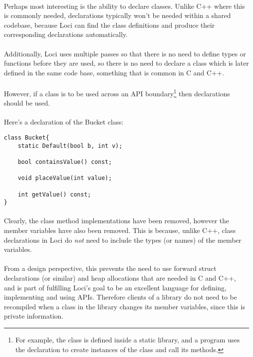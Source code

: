 \documentclass[12pt,twoside,notitlepage]{report}
\begin{document}
\paragraph{}
Perhaps most interesting is the ability to declare classes. Unlike C++ where this is commonly needed, declarations typically won't be needed within a shared codebase, because Loci can find the class definitions and produce their corresponding declarations automatically.

\paragraph{}
Additionally, Loci uses multiple passes so that there is no need to define types or functions before they are used, so there is no need to declare a class which is later defined in the same code base, something that is common in C and C++.

\paragraph{}
However, if a class is to be used across an API boundary\footnote{For example, the class is defined inside a static library, and a program uses the declaration to create instances of the class and call its methods.} then declarations should be used.

\paragraph{}
Here's a declaration of the Bucket class:


\begin{lstlisting}
class Bucket{
	static Default(bool b, int v);

	bool containsValue() const;
	
	void placeValue(int value);
	
	int getValue() const;
}
\end{lstlisting}


\paragraph{}
Clearly, the class method implementations have been removed, however the member variables have also been removed. This is because, unlike C++, class declarations in Loci do \emph{not} need to include the types (or names) of the member variables.

\paragraph{}
From a design perspective, this prevents the need to use forward struct declarations (or similar) and heap allocations that are needed in C and C++, and is part of fulfilling Loci's goal to be an excellent language for defining, implementing and using APIs. Therefore clients of a library do not need to be recompiled when a class in the library changes its member variables, since this is private information.
\end{document}
